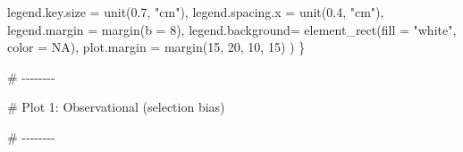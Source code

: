 \documentclass[
  letterpaper,
  DIV=11,
  numbers=noendperiod]{scrreprt}
\newenvironment{Shaded}{\begin{snugshade}}{\end{snugshade}}
\newcommand{\AttributeTok}[1]{\textcolor[rgb]{0.40,0.45,0.13}{#1}}
\newcommand{\CommentTok}[1]{\textcolor[rgb]{0.37,0.37,0.37}{#1}}
\newcommand{\ConstantTok}[1]{\textcolor[rgb]{0.56,0.35,0.01}{#1}}
\newcommand{\DecValTok}[1]{\textcolor[rgb]{0.68,0.00,0.00}{#1}}
\newcommand{\FloatTok}[1]{\textcolor[rgb]{0.68,0.00,0.00}{#1}}
\newcommand{\FunctionTok}[1]{\textcolor[rgb]{0.28,0.35,0.67}{#1}}
\newcommand{\NormalTok}[1]{\textcolor[rgb]{0.00,0.23,0.31}{#1}}
\newcommand{\StringTok}[1]{\textcolor[rgb]{0.13,0.47,0.30}{#1}}
\begin{document}
\begin{Shaded}
\begin{Highlighting}[]
\AttributeTok{legend.key.size  =} \FunctionTok{unit}\NormalTok{(}\FloatTok{0.7}\NormalTok{, }\StringTok{"cm"}\NormalTok{),}
\AttributeTok{legend.spacing.x =} \FunctionTok{unit}\NormalTok{(}\FloatTok{0.4}\NormalTok{, }\StringTok{"cm"}\NormalTok{),}
\AttributeTok{legend.margin    =} \FunctionTok{margin}\NormalTok{(}\AttributeTok{b =} \DecValTok{8}\NormalTok{),}
\AttributeTok{legend.background=} \FunctionTok{element\_rect}\NormalTok{(}\AttributeTok{fill =} \StringTok{"white"}\NormalTok{, }\AttributeTok{color =} \ConstantTok{NA}\NormalTok{),}
\AttributeTok{plot.margin      =} \FunctionTok{margin}\NormalTok{(}\DecValTok{15}\NormalTok{, }\DecValTok{20}\NormalTok{, }\DecValTok{10}\NormalTok{, }\DecValTok{15}\NormalTok{)}
\NormalTok{)}
\NormalTok{\}}

\CommentTok{\# {-}{-}{-}{-}{-}{-}{-}{-}}

\CommentTok{\# Plot 1: Observational (selection bias)}

\CommentTok{\# {-}{-}{-}{-}{-}{-}{-}{-}}


\end{Highlighting}
\end{Shaded}
\end{document}
